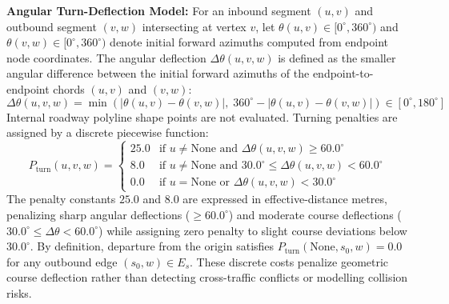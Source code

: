 \documentclass[conference]{IEEEtran}
\begin{document}
\noindent\textbf{Angular Turn-Deflection Model:} For an inbound segment $(u, v)$ and outbound segment $(v, w)$ intersecting at vertex $v$, let $\theta(u, v) \in [0^\circ, 360^\circ)$ and $\theta(v, w) \in [0^\circ, 360^\circ)$ denote initial forward azimuths computed from endpoint node coordinates. The angular deflection $\Delta\theta(u, v, w)$ is defined as the smaller angular difference between the initial forward azimuths of the endpoint-to-endpoint chords $(u, v)$ and $(v, w)$:
\begin{equation*}
\Delta\theta(u, v, w) = \min\left(|\theta(u, v) - \theta(v, w)|, \; 360^\circ - |\theta(u, v) - \theta(v, w)|\right) \in [0^\circ, 180^\circ]
\end{equation*}
Internal roadway polyline shape points are not evaluated. Turning penalties are assigned by a discrete piecewise function:
\begin{equation}
\label{eq:turn_penalty}
P_{\text{turn}}(u, v, w) = \begin{cases}
25.0 & \text{if } u \ne \text{None} \text{ and } \Delta\theta(u, v, w) \ge 60.0^\circ \\
8.0 & \text{if } u \ne \text{None} \text{ and } 30.0^\circ \le \Delta\theta(u, v, w) < 60.0^\circ \\
0.0 & \text{if } u = \text{None} \text{ or } \Delta\theta(u, v, w) < 30.0^\circ
\end{cases}
\end{equation}
The penalty constants $25.0$ and $8.0$ are expressed in effective-distance metres, penalizing sharp angular deflections ($\ge 60.0^\circ$) and moderate course deflections ($30.0^\circ \le \Delta\theta < 60.0^\circ$) while assigning zero penalty to slight course deviations below $30.0^\circ$. By definition, departure from the origin satisfies $P_{\text{turn}}(\text{None}, s_0, w) = 0.0$ for any outbound edge $(s_0, w) \in E_s$. These discrete costs penalize geometric course deflection rather than detecting cross-traffic conflicts or modelling collision risks.
\end{document}

